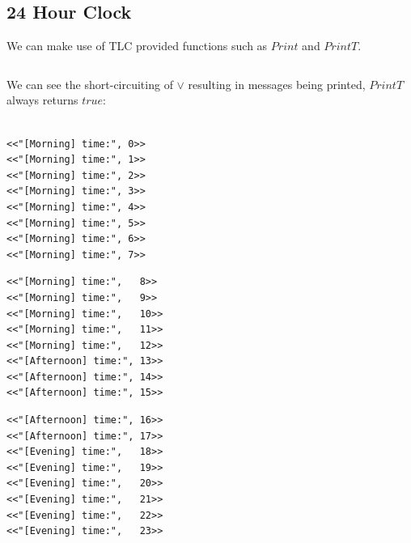 \subsection{24 Hour Clock}
We can make use of TLC provided functions such as $Print$ and $PrintT$.
\\

\inputminted{text}{tla_plus/code/24HourClock.tla}
We can see the short-circuiting of $\lor$ resulting in messages being printed, $PrintT$ always returns $true$:
\\
\\ \begin{minipage}{.33\textwidth}
\begin{verbatim}
<<"[Morning] time:", 0>>
<<"[Morning] time:", 1>>
<<"[Morning] time:", 2>>
<<"[Morning] time:", 3>>
<<"[Morning] time:", 4>>
<<"[Morning] time:", 5>>
<<"[Morning] time:", 6>>
<<"[Morning] time:", 7>>
\end{verbatim}  
\end{minipage}
\begin{minipage}{.33\textwidth}
\begin{verbatim}
<<"[Morning] time:",   8>>
<<"[Morning] time:",   9>>
<<"[Morning] time:",   10>>
<<"[Morning] time:",   11>>
<<"[Morning] time:",   12>>
<<"[Afternoon] time:", 13>>
<<"[Afternoon] time:", 14>>
<<"[Afternoon] time:", 15>>
\end{verbatim}
\end{minipage}
\begin{minipage}{.33\textwidth}
\begin{verbatim}
<<"[Afternoon] time:", 16>>
<<"[Afternoon] time:", 17>>
<<"[Evening] time:",   18>>
<<"[Evening] time:",   19>>
<<"[Evening] time:",   20>>
<<"[Evening] time:",   21>>
<<"[Evening] time:",   22>>
<<"[Evening] time:",   23>>
\end{verbatim}
\end{minipage}

